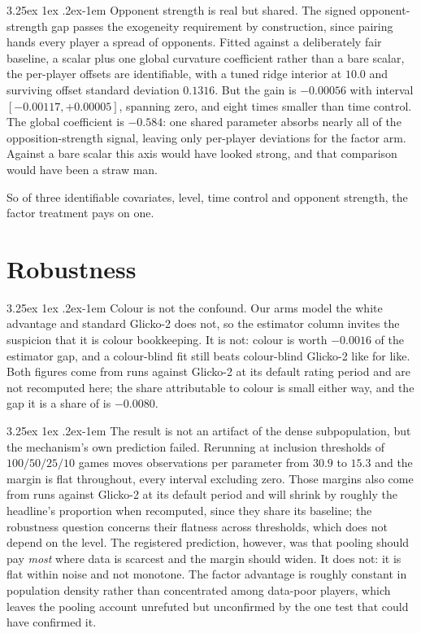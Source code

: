 \documentclass[11pt]{article}
\makeatletter
\renewcommand\paragraph{\@startsection{paragraph}{4}{\z@}%
  {3.25ex \@plus1ex \@minus.2ex}{-1em}%
  {\normalfont\normalsize\itshape}}
\makeatother
\begin{document}
\paragraph{Opponent strength is real but shared.} The signed
opponent-strength gap passes the exogeneity requirement by
construction, since pairing hands every player a spread of opponents.
Fitted against a deliberately fair baseline, a scalar plus one global
curvature coefficient rather than a bare scalar, the per-player offsets are identifiable, with a tuned ridge interior at
$10.0$ and surviving offset standard deviation $0.1316$. But the gain
is $-0.00056$ with interval $[-0.00117, +0.00005]$, spanning zero, and
eight times smaller than time control. The global coefficient is
$-0.584$: one shared parameter absorbs nearly all of the
opposition-strength signal, leaving only per-player deviations for the
factor arm. Against a bare scalar this axis would have looked strong,
and that comparison would have been a straw man.

So of three identifiable covariates, level, time control and opponent
strength, the factor treatment pays on one.

\section{Robustness}

\paragraph{Colour is not the confound.} Our arms model the white
advantage and standard Glicko-2 does not, so the estimator column
invites the suspicion that it is colour bookkeeping. It is not: colour
is worth $-0.0016$ of the estimator gap, and a colour-blind fit still
beats colour-blind Glicko-2 like for like. Both figures come from runs
against Glicko-2 at its default rating period and are not recomputed
here; the share attributable to colour is small either way, and the gap
it is a share of is $-0.0080$.

\paragraph{The result is not an artifact of the dense subpopulation, but
the mechanism's own prediction failed.} Rerunning at inclusion
thresholds of $100/50/25/10$ games moves observations per parameter
from $30.9$ to $15.3$ and the margin is flat throughout, every interval
excluding zero. Those margins also come from runs against Glicko-2 at
its default period and will shrink by roughly the headline's
proportion when recomputed, since they share its baseline; the
robustness
question concerns their flatness across thresholds, which does not
depend on the level. The registered prediction, however, was that
pooling should pay \emph{most} where data is scarcest and the margin
should widen. It does not: it is flat within noise and not monotone.
The factor advantage is roughly constant in population density rather than concentrated among data-poor players,
which leaves the pooling account unrefuted but unconfirmed by the one
test that could have confirmed it.
\end{document}
